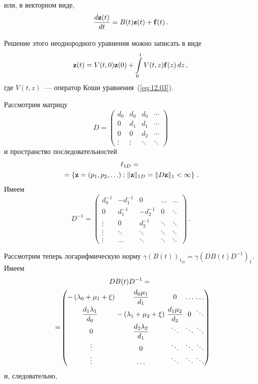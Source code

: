 \begin{multicols}{2}

или, в векторном виде,
\begin{equation}
\label{eq:12.03}
\displaystyle\frac{\displaystyle d{\bf z}(t)\mathstrut}{\displaystyle dt\mathstrut}=B(t){\bf z}(t)+{\bf f}(t)\,.
\end{equation}


Решение этого неоднородного уравнения можно записать в виде
\begin{equation*}
{\bf z}(t)= V(t,0){\bf z}(0)+\int\limits_0^t{}V(t,z){\bf f}(z)\,dz\,,
\end{equation*}
где $V(t,z)$~--- оператор Коши уравнения~(\ref{eq:12.03}).

Рассмотрим матрицу
\begin{equation*}
  D=
\begin{pmatrix}
  d_0 & d_0 & d_0 & \cdots \\
  0   & d_1 & d_1 & \cdots \\
  0   & 0   & d_2 & \cdots \\
  \vdots & \vdots & \ddots & \ddots
\end{pmatrix}
\end{equation*}
и пространство последовательностей
\begin{multline*}
\ell_{1D}={}\\
{}=
\left\{{\bf z} =(p_1,p_2,\ldots):\|{\bf z}\|_{1D}=
\|D{\bf
z}\|_1<\infty\right\}\,. 
\end{multline*}
Имеем
\begin{equation*}
D^{-1}=
\begin{pmatrix}
d_0^{-1} & -d_1^{-1} & 0 & \ldots &\ldots  \\
0 & d_1^{-1} & -d_2^{-1} & 0 & \ddots \\
\vdots & 0 & d_2^{-1} & \ddots & \ddots \\
\vdots& \ddots & \ddots & \ddots & \ddots \\
\vdots&\ldots  & \ddots & \ddots & \ddots
\end{pmatrix}\,.
\end{equation*}

Рассмотрим теперь логарифмическую норму $\gamma
\left(B(t)\right)_{1_D}=  \gamma \left(D B(t)D^{-1}\right)_{1}$.
Имеем
\begin{multline*}
DB(t)D^{-1}={}\\
{}=\!
\begin{pmatrix}
-\left( \lambda _0+\mu _1 +\xi\right) \!\!&\!\! \fr{d_0 \mu_1}{d_1}\!\!
&\!\! 0\!\! &\!\!\ldots\!\!
&\!\! \ldots \\
\fr{d_1  \lambda _1}{d_0} & \!\!-\left( \lambda _1+\mu _2
+\xi\right)\!\! &\!\!
\fr{d_1\mu _2}{ d_2} \!\!&\!\! 0\!\! &\!\! \ddots \\
0\!\!&\!\! \fr{d_2  \lambda _2}{d_1} \!\!&\!\! \ddots\!\! &\!\! \ddots\!\! &\!\! \ddots \\
\vdots\!\! &\!\! 0\!\! &\!\! \ddots\!\! &\!\! \ddots\!\! &\!\! \ddots \\
\vdots\!\!&\!\! \ldots\!\! &\!\! \ddots\!\! &\!\! \ddots\!\! &\!\! \ddots
\end{pmatrix}\!\!
\end{multline*}
и, следовательно,


\end{multicols}
